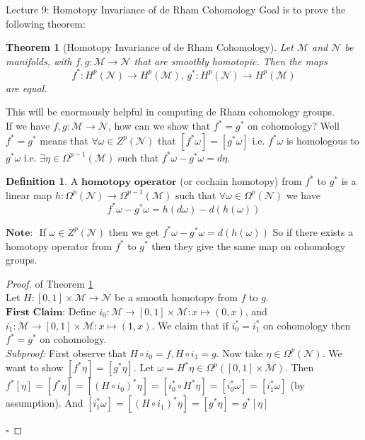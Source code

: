 \documentclass[10pt]{article}
\theoremstyle{plain}
\newtheorem{theorem}{Theorem}[section]
\theoremstyle{definition}
\newtheorem{defn}[thm]{Definition} %
\newenvironment{subproof}{\textit{Subproof:}}{\hfill$\square$}
\newcommand{\Note}{\textbf{Note: }}
\newcommand{\man}{\mathcal{M}}
\newcommand{\nan}{\mathcal{N}}
\newcommand{\pformman}[1]{\Omega^{#1}(\man)}
\newcommand{\pformnan}[1]{\Omega^{#1}(\nan)}
\newcommand{\deriv}{d}
\newcommand{\dw}{d\omega}
\newcommand{\cohomman}[1]{H^{#1}(\man)}
\newcommand{\cohomnan}[1]{H^{#1}(\nan)}
\newcommand{\coZnan}[1]{Z^{#1}(\nan)}
\newcommand{\inter}{\left[0,1\right]}
\begin{document}
\begin{section}{Lecture 9: Homotopy Invariance of de Rham Cohomology}
Goal is to prove the following theorem:
\begin{theorem}[Homotopy Invariance of de Rham Cohomology]\label{theorem:homotopyinvariance}
 Let $\man$ and $\nan$ be manifolds, with $f,g: \man \to \nan$ that are smoothly homotopic. Then the maps 
$$f^*:\cohomnan{p} \to \cohomman{p}, \,g^*:\cohomnan{p} \to \cohomman{p}$$
are equal.
\end{theorem}
This will be enormously helpful in computing de Rham cohomology groups.\\
If we have $f,g:\man \to \nan$, how can we show that $f^* = g^*$ on cohomology? Well $f^* =g^*$ means that $\forall \omega \in \coZnan{p}$ that $[f^*\omega] = [g^*\omega]$ i.e. $f^*\omega$ is homologous to $g^*\omega$ i.e. $\exists \eta \in \pformman{p-1}$ such that $f^*\omega - g^* \omega = \deriv \eta$.
\begin{defn}
\label{defn:homotopyoperator}
A $\textbf{homotopy operator}$ (or cochain homotopy) from $f^*$ to $g^*$ is a linear map $h:\pformnan{p} \to \pformman{p-1}$ such that $\forall \omega \in \pformnan{p}$ we have \begin{equation}
    f^*\omega - g^*\omega = h(\dw)-\deriv(h(\omega))\tag{$*$}
\end{equation}
\end{defn}\noindent
$\Note$ If $\omega \in \coZnan{p}$ then we get $f^*\omega - g^*\omega = \deriv(h(\omega))$
So if there exists a homotopy operator from $f^*$ to $g^*$ then they give the same map on cohomology groups.
\begin{proof}{of Theorem \ref{theorem:homotopyinvariance}}\\
Let $H:[0,1]\times \man \to \nan $ be a smooth homotopy from $f$ to  $g$.\\
$\textbf{First Claim:}$ Define $i_0 :\man \to \inter \times \man: x \mapsto (0,x)$, and $i_1 :\man \to \inter \times \man: x \mapsto (1,x)$. We claim that if $i_0^* = i_1^*$ on cohomology then $f^* = g^*$ on cohomology.\\
\begin{subproof}
First observe that $H\circ i_0 = f, H\circ i_1 = g$. Now take $\eta \in \pformnan{p}$. We want to show $[f^*\eta ] = [g^*\eta]$. Let $\omega = H^* \eta \in \Omega^p(\inter \times \man). $ Then $f^*[\eta] = [f^*\eta] = [(H\circ i_0)^*\eta] = [i_0^* \circ H^* \eta ] = [i_0^* \omega] = [i_1^*\omega ]$ (by assumption). And $[i^*_1\omega] = [(H\circ i_1)^* \eta] = [g^*\eta] =g^*[\eta]$

\end{subproof}
\end{proof}
\end{section}
\end{document}
